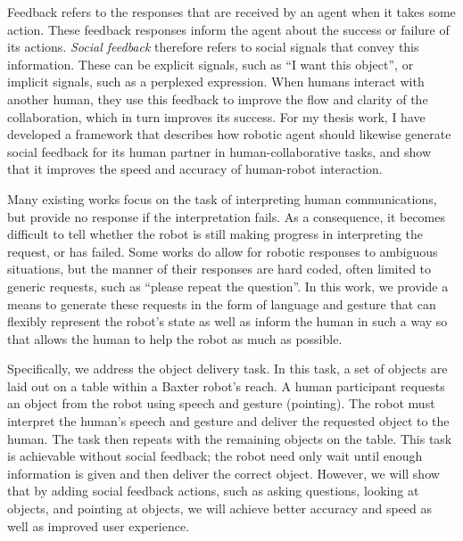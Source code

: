 \documentclass[conference]{IEEEtran}
\begin{document}
Feedback refers to the responses that are received by an agent when it takes some action. These feedback responses inform the agent about the success or failure of its actions. \emph{Social feedback} therefore refers to social signals that convey this information. These can be explicit signals, such as ``I want this object'', or implicit signals, such as a perplexed expression. When humans interact with another human, they use this feedback to improve the flow and clarity of the collaboration, which in turn improves its success. For my thesis work, I have developed a framework that describes how robotic agent should likewise generate social feedback for its human partner in human-collaborative tasks, and show that it improves the speed and accuracy of human-robot interaction. 

Many existing works focus on the task of interpreting human communications\citep{tellex11,matuszek12,tellex12,misra14}, but provide no response if the interpretation fails. As a consequence, it becomes difficult to tell whether the robot is still making progress in interpreting the request, or has failed. Some works do allow for robotic responses to ambiguous situations, but the manner of their responses are hard coded, often limited to generic requests, such as ``please repeat the question''. In this work, we provide a means to generate these requests in the form of language and gesture that can flexibly represent the robot's state as well as inform the human in such a way so that allows the human to help the robot as much as possible. 

Specifically, we address the object delivery task. In this task, a set of objects are laid out on a table within a Baxter robot's reach. A human participant requests an object from the robot using speech and gesture (pointing). The robot must interpret the human's speech and gesture and deliver the requested object to the human. The task then repeats with the remaining objects on the table. This task is achievable without social feedback; the robot need only wait until enough information is given and then deliver the correct object. However, we will show that by adding social feedback actions, such as asking questions, looking at objects, and pointing at objects, we will achieve better accuracy and speed as well as improved user experience. 
\end{document}
